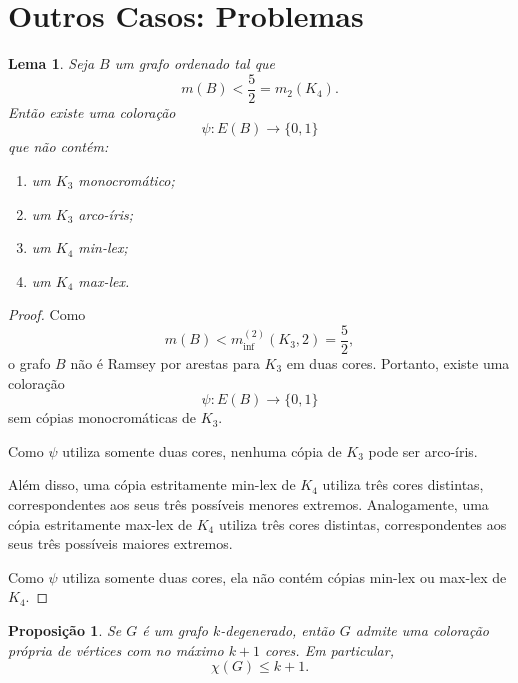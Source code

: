 \documentclass[reqno, 12pt]{amsart}
\numberwithin{equation}{section}
\theoremstyle{plain}
\newtheorem{proposition}[theorem]{Proposição}
\newtheorem{lemma}[theorem]{Lema}
\theoremstyle{definition}
\begin{document}
\section{Outros Casos: Problemas}
\label{sec:outros}

\begin{lemma}
  \label{lem:334-density}
  Seja $B$ um grafo ordenado tal que
  \[
    m(B)<\frac52=m_2(K_4).
  \]
  Então existe uma coloração
  \[
    \psi:E(B)\longrightarrow\{0,1\}
  \]
  que não contém:
  \begin{enumerate}
    \item[(i)] um $K_3$ monocromático;
    \item[(ii)] um $K_3$ arco-íris;
    \item[(iii)] um $K_4$ min-lex;
    \item[(iv)] um $K_4$ max-lex.
  \end{enumerate}
\end{lemma}

\begin{proof}
  Como
  \[
    m(B)<m_{\inf}^{(2)}(K_3,2)=\frac52,
  \]
  o grafo $B$ não é Ramsey por arestas para $K_3$ em duas cores.
  Portanto, existe uma coloração
  \[
    \psi:E(B)\longrightarrow\{0,1\}
  \]
  sem cópias monocromáticas de $K_3$.

  Como $\psi$ utiliza somente duas cores, nenhuma cópia de $K_3$
  pode ser arco-íris.

  Além disso, uma cópia estritamente min-lex de $K_4$ utiliza
  três cores distintas, correspondentes aos seus três possíveis
  menores extremos. Analogamente, uma cópia estritamente max-lex
  de $K_4$ utiliza três cores distintas, correspondentes aos seus
  três possíveis maiores extremos.

  Como $\psi$ utiliza somente duas cores, ela não contém cópias
  min-lex ou max-lex de $K_4$.
\end{proof}



\begin{proposition}
  Se \(G\) é um grafo \(k\)-degenerado, então \(G\) admite uma coloração própria de vértices com no máximo \(k+1\) cores. Em particular,
  \[
    \chi(G) \leq k+1.
  \]
\end{proposition}
\end{document}
